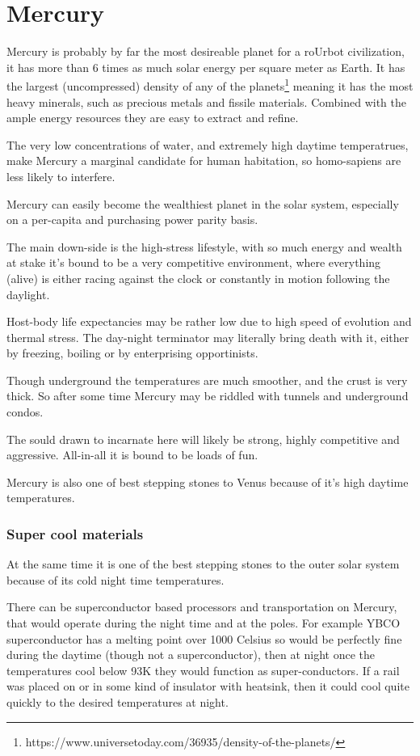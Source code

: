 \section{Mercury}
Mercury is probably by far the most desireable planet for a roUrbot civilization, 
it has more than 6 times as much solar energy per square meter as Earth. 
It has the largest (uncompressed) density of any of the
planets\footnote{https://www.universetoday.com/36935/density-of-the-planets/}
meaning it has the most heavy minerals, 
such as precious metals and fissile materials.  Combined with the ample energy
resources they are easy to extract and refine. 

The very low concentrations of water, and extremely high daytime temperatrues,
 make Mercury a marginal candidate for human habitation, so homo-sapiens are
less likely to interfere.

Mercury can easily become the wealthiest planet in the solar system, especially
on a per-capita and purchasing power parity basis. 

The main down-side is the high-stress lifestyle, with so much energy and wealth
at stake it's bound to be a very competitive environment, where everything
(alive) is either racing against the clock or constantly in motion following the
daylight.

Host-body life expectancies may be rather low due to high speed of evolution
 and thermal stress. The day-night terminator may literally bring death with it,
either by freezing, boiling or by enterprising opportinists.

Though underground the temperatures are much smoother, and the crust is very
thick.  So after some time Mercury may be riddled with tunnels and underground
condos. 

The sould drawn to incarnate here will likely be strong, highly competitive and
aggressive. All-in-all it is bound to be loads of fun.

Mercury is also one of best stepping stones to Venus because of it's high
daytime temperatures.  

\subsubsection{Super cool materials}

At the same time it is one of the best stepping stones to
the outer solar system because of its cold night time temperatures. 

There can be superconductor based processors and transportation on
Mercury, that would operate during the night time and at the poles. 
For example YBCO superconductor has a melting point over 1000 Celsius 
so would be perfectly fine during the daytime (though not a superconductor), 
then at night once the temperatures cool below 93K they would function as
super-conductors.  If a rail was placed on or in some kind of insulator with
heatsink, then it could cool quite quickly to the desired temperatures at night.


